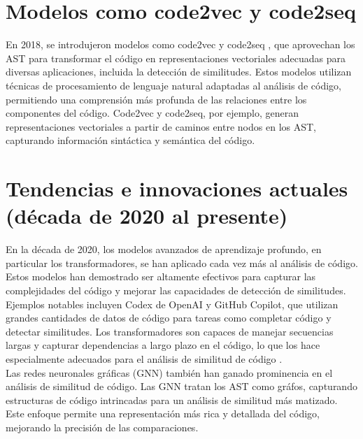 \section*{\textbf{Modelos como code2vec y code2seq}}
En 2018, se introdujeron modelos como code2vec \cite{alon2019code2vec} y code2seq \cite{alon2019code2seq}, que aprovechan los AST para transformar el código en representaciones vectoriales adecuadas para diversas aplicaciones, incluida la detección de similitudes. Estos modelos utilizan técnicas de procesamiento de lenguaje natural adaptadas al análisis de código, permitiendo una comprensión más profunda de las relaciones entre los componentes del código. Code2vec y code2seq, por ejemplo, generan representaciones vectoriales a partir de caminos entre nodos en los AST, capturando información sintáctica y semántica del código.

\section*{\textbf{Tendencias e innovaciones actuales (década de 2020 al presente)}}
En la década de 2020, los modelos avanzados de aprendizaje profundo, en particular los transformadores, se han aplicado cada vez más al análisis de código. Estos modelos han demostrado ser altamente efectivos para capturar las complejidades del código y mejorar las capacidades de detección de similitudes. \\

Ejemplos notables incluyen Codex de OpenAI y GitHub Copilot, que utilizan grandes cantidades de datos de código para tareas como completar código y detectar similitudes. Los transformadores son capaces de manejar secuencias largas y capturar dependencias a largo plazo en el código, lo que los hace especialmente adecuados para el análisis de similitud de código \cite{vaswani2017attention}. \\

Las redes neuronales gráficas (GNN) también han ganado prominencia en el análisis de similitud de código. Las GNN tratan los AST como gráfos, capturando estructuras de código intrincadas para un análisis de similitud más matizado. Este enfoque permite una representación más rica y detallada del código, mejorando la precisión de las comparaciones.

